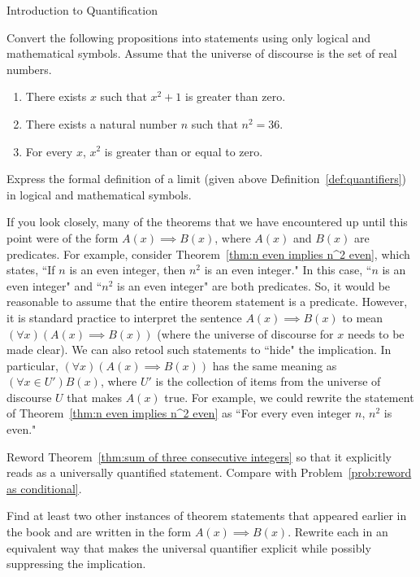 \begin{section}{Introduction to Quantification}
\begin{problem}
Convert the following propositions into statements using only logical and mathematical symbols.  Assume that the universe of discourse is the set of real numbers.
\begin{enumerate}[label=\textrm{(\alph*)}]
\item There exists $x$ such that $x^2+1$ is greater than zero.
\item There exists a natural number $n$ such that $n^2=36$. 
\item For every $x$, $x^2$ is greater than or equal to zero.
\end{enumerate}
\end{problem}

\begin{problem}
Express the formal definition of a limit (given above Definition~\ref{def:quantifiers}) in logical and mathematical symbols.
\end{problem}

If you look closely, many of the theorems that we have encountered up until this point were of the form $A(x)\implies B(x)$, where $A(x)$ and $B(x)$ are predicates.  For example, consider Theorem~\ref{thm:n even implies n^2 even}, which states, ``If $n$ is an even integer, then $n^2$ is an even integer." In this case, ``$n$ is an even integer" and ``$n^2$ is an even integer" are both predicates.  So, it would be reasonable to assume that the entire theorem statement is a predicate.  However, it is standard practice to interpret the sentence $A(x)\implies B(x)$ to mean $(\forall x)(A(x)\implies B(x))$ (where the universe of discourse for $x$ needs to be made clear). We can also retool such statements to ``hide" the implication. In particular, $(\forall x)(A(x)\implies B(x))$ has the same meaning as $(\forall x \in U')B(x)$, where $U'$ is the collection of items from the universe of discourse $U$ that makes $A(x)$ true. For example, we could rewrite the statement of Theorem~\ref{thm:n even implies n^2 even} as ``For every even integer $n$, $n^2$ is even."

\begin{problem}
Reword Theorem~\ref{thm:sum of three consecutive integers} so that it explicitly reads as a universally quantified statement. Compare with Problem~\ref{prob:reword as conditional}.
\end{problem}

\begin{problem}
Find at least two other instances of theorem statements that appeared earlier in the book and are written in the form $A(x)\implies B(x)$. Rewrite each in an equivalent way that makes the universal quantifier explicit while possibly suppressing the implication.
\end{problem}


\end{section}
